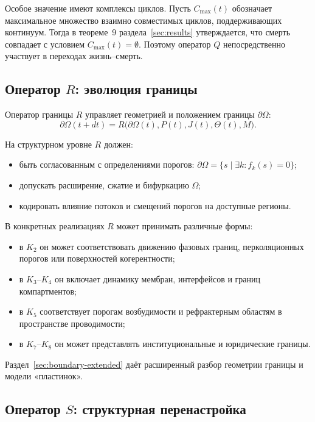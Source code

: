 Особое значение имеют комплексы циклов. Пусть \(C_{\max}(t)\) обозначает
максимальное множество взаимно совместимых циклов, поддерживающих континуум.
Тогда в теореме~9 раздела~\ref{sec:results} утверждается, что смерть
совпадает с условием \(C_{\max}(t) = \emptyset\). Поэтому оператор \(Q\)
непосредственно участвует в переходах жизнь–смерть.

\subsection{Оператор \texorpdfstring{\texorpdfstring{$R$}{R}}{R}: эволюция границы}

Оператор границы \(R\) управляет геометрией и положением границы
\(\partial\Omega\):
\[
  \partial\Omega(t+dt) =
    R\big(\partial\Omega(t), P(t), J(t), \Theta(t), M\big).
\]

На структурном уровне \(R\) должен:
\begin{itemize}
  \item быть согласованным с определениями порогов:
        \(\partial\Omega = \{ s \mid \exists k: f_k(s) = 0 \}\);
  \item допускать расширение, сжатие и бифуркацию \(\Omega\);
  \item кодировать влияние потоков и смещений порогов на доступные регионы.
\end{itemize}

В конкретных реализациях \(R\) может принимать различные формы:
\begin{itemize}
  \item в \(K_2\) он может соответствовать движению фазовых границ,
        перколяционных порогов или поверхностей когерентности;
  \item в \(K_3\)–\(K_4\) он включает динамику мембран, интерфейсов и
        границ компартментов;
  \item в \(K_5\) соответствует порогам возбудимости и рефрактерным
        областям в пространстве проводимости;
  \item в \(K_7\)–\(K_8\) он может представлять институциональные и
        юридические границы.
\end{itemize}

Раздел~\ref{sec:boundary-extended} даёт расширенный разбор геометрии
границы и модели «пластинок».

\subsection{Оператор \texorpdfstring{\texorpdfstring{$S$}{S}}{S}: структурная
перенастройка}

